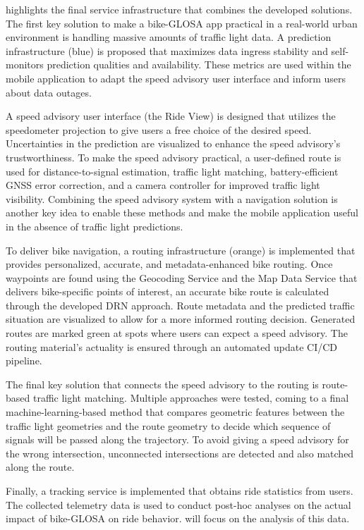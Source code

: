  highlights the final service infrastructure that combines the developed solutions. The first key solution to make a bike-GLOSA app practical in a real-world urban environment is handling massive amounts of traffic light data. A prediction infrastructure (blue) is proposed that maximizes data ingress stability and self-monitors prediction qualities and availability. These metrics are used within the mobile application to adapt the speed advisory user interface and inform users about data outages.

A speed advisory user interface (the Ride View) is designed that utilizes the speedometer projection to give users a free choice of the desired speed. Uncertainties in the prediction are visualized to enhance the speed advisory's trustworthiness. To make the speed advisory practical, a user-defined route is used for distance-to-signal estimation, traffic light matching, battery-efficient GNSS error correction, and a camera controller for improved traffic light visibility. Combining the speed advisory system with a navigation solution is another key idea to enable these methods and make the mobile application useful in the absence of traffic light predictions.

To deliver bike navigation, a routing infrastructure (orange) is implemented that provides personalized, accurate, and metadata-enhanced bike routing. Once waypoints are found using the Geocoding Service and the Map Data Service that delivers bike-specific points of interest, an accurate bike route is calculated through the developed DRN approach. Route metadata and the predicted traffic situation are visualized to allow for a more informed routing decision. Generated routes are marked green at spots where users can expect a speed advisory. The routing material's actuality is ensured through an automated update CI/CD pipeline. 

The final key solution that connects the speed advisory to the routing is route-based traffic light matching. Multiple approaches were tested, coming to a final machine-learning-based method that compares geometric features between the traffic light geometries and the route geometry to decide which sequence of signals will be passed along the trajectory. To avoid giving a speed advisory for the wrong intersection, unconnected intersections are detected and also matched along the route.

Finally, a tracking service is implemented that obtains ride statistics from users. The collected telemetry data is used to conduct post-hoc analyses on the actual impact of bike-GLOSA on ride behavior.  will focus on the analysis of this data.

